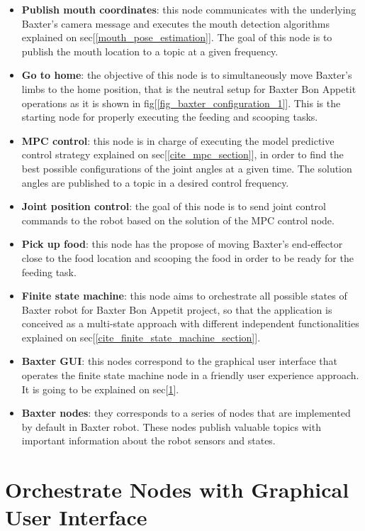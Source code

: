 \documentclass[11pt]{report} %
\begin{document}
\begin{itemize}
    \item \textbf{Publish mouth coordinates}: this node communicates with the underlying Baxter's camera message and executes the mouth detection algorithms explained on sec[\ref{mouth_pose_estimation}]. The goal of this node is to publish the mouth location to a topic at a given frequency.
    \item \textbf{Go to home}: the objective of this node is to simultaneously move Baxter's limbs to the home position, that is the neutral setup for Baxter Bon Appetit operations as it is shown in fig[\ref{fig_baxter_configuration_1}]. This is the starting node for properly executing the feeding and scooping tasks. 
    \item \textbf{MPC control}: this node is in charge of executing the model predictive control strategy explained on sec[\ref{cite_mpc_section}], in order to find the best possible configurations of the joint angles at a given time. The solution angles are published to a topic in a desired control frequency.
    \item \textbf{Joint position control}: the goal of this node is to send joint control commands to the robot based on the solution of the MPC control node.
    \item \textbf{Pick up food}: this node has the propose of moving Baxter's end-effector close to the food location and scooping the food in order to be ready for the feeding task.
    \item \textbf{Finite state machine}: this node aims to orchestrate all possible states of Baxter robot for Baxter Bon Appetit project, so that the application is conceived as a multi-state approach with different independent functionalities explained on sec[\ref{cite_finite_state_machine_section}].
    \item \textbf{Baxter GUI}: this nodes correspond to the graphical user interface that operates the finite state machine node in a friendly user experience approach. It is going to be explained on sec[\ref{ref_gui_section}].
    \item \textbf{Baxter nodes}: they corresponds to a series of nodes that are implemented by default in Baxter robot. These nodes publish valuable topics with important information about the robot sensors and states.
\end{itemize}

\section{Orchestrate Nodes with Graphical User Interface} \label{ref_gui_section}
\end{document}
